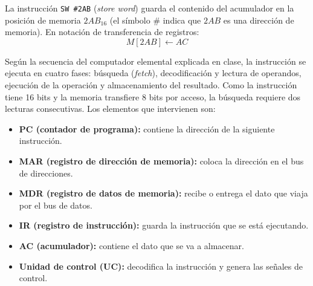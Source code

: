 \documentclass[10pt]{article}
\begin{document}
La instrucción \texttt{SW \#2AB} (\emph{store word}) guarda el contenido del acumulador en la posición de memoria $2AB_{16}$ (el símbolo \# indica que $2AB$ es una dirección de memoria). En notación de transferencia de registros:
\[
  M[2AB] \leftarrow AC
\]
 
Según la secuencia del computador elemental explicada en clase, la instrucción se ejecuta en cuatro fases: búsqueda (\emph{fetch}), decodificación y lectura de operandos, ejecución de la operación y almacenamiento del resultado. Como la instrucción tiene 16 bits y la memoria transfiere 8 bits por acceso, la búsqueda requiere dos lecturas consecutivas. Los elementos que intervienen son:
 
\begin{itemize}
  \item \textbf{PC (contador de programa):} contiene la dirección de la siguiente instrucción.
  \item \textbf{MAR (registro de dirección de memoria):} coloca la dirección en el bus de direcciones.
  \item \textbf{MDR (registro de datos de memoria):} recibe o entrega el dato que viaja por el bus de datos.
  \item \textbf{IR (registro de instrucción):} guarda la instrucción que se está ejecutando.
  \item \textbf{AC (acumulador):} contiene el dato que se va a almacenar.
  \item \textbf{Unidad de control (UC):} decodifica la instrucción y genera las señales de control.
\end{itemize}
 
\end{document}
